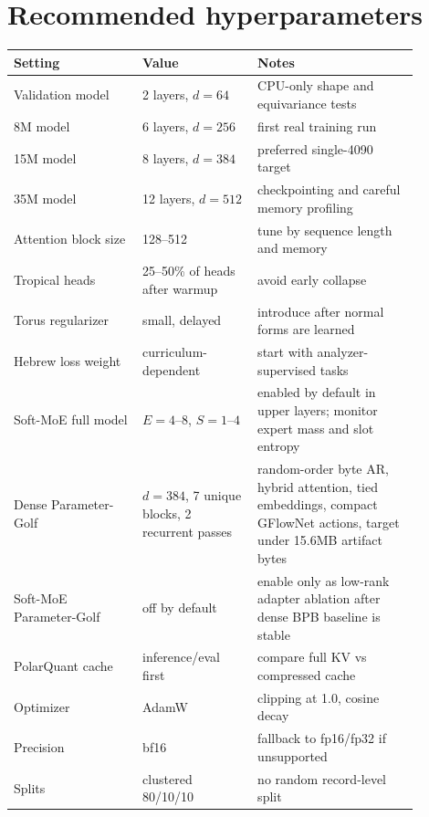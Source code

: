 \documentclass[11pt]{article}
\theoremstyle{definition}
\theoremstyle{plain}
\theoremstyle{remark}
\numberwithin{equation}{section}
\begin{document}
\section{Recommended hyperparameters}

\begin{longtable}{p{0.28\linewidth}p{0.25\linewidth}p{0.35\linewidth}}
\toprule
Setting & Value & Notes \\
\midrule
\endhead
Validation model & 2 layers, $d=64$ & CPU-only shape and equivariance tests \\
8M model & 6 layers, $d=256$ & first real training run \\
15M model & 8 layers, $d=384$ & preferred single-4090 target \\
35M model & 12 layers, $d=512$ & checkpointing and careful memory profiling \\
Attention block size & 128--512 & tune by sequence length and memory \\
Tropical heads & 25--50\% of heads after warmup & avoid early collapse \\
Torus regularizer & small, delayed & introduce after normal forms are learned \\
Hebrew loss weight & curriculum-dependent & start with analyzer-supervised tasks \\
Soft-MoE full model & $E=4$--$8$, $S=1$--$4$ & enabled by default in upper layers; monitor expert mass and slot entropy \\
Dense Parameter-Golf & $d=384$, 7 unique blocks, 2 recurrent passes & random-order byte AR, hybrid attention, tied embeddings, compact GFlowNet actions, target under 15.6MB artifact bytes \\
Soft-MoE Parameter-Golf & off by default & enable only as low-rank adapter ablation after dense BPB baseline is stable \\
PolarQuant cache & inference/eval first & compare full KV vs compressed cache \\
Optimizer & AdamW & clipping at 1.0, cosine decay \\
Precision & bf16 & fallback to fp16/fp32 if unsupported \\
Splits & clustered 80/10/10 & no random record-level split \\
\bottomrule
\end{longtable}
\end{document}
